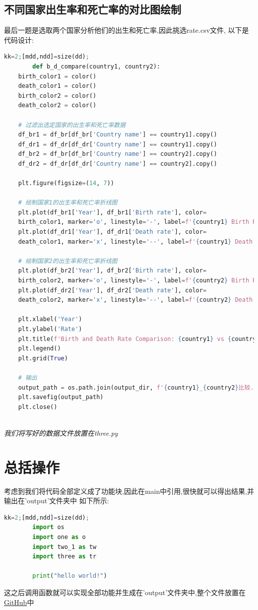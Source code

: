 \documentclass{ctexart}
\begin{document}
    \subsection{\textbf{不同国家出生率和死亡率的对比图绘制}}
    \noindent 最后一题是选取两个国家分析他们的出生和死亡率,因此挑选rate.csv文件,
    以下是代码设计:
    \begin{lstlisting}[language=Python]
        kk=2;[mdd,ndd]=size(dd);
        def b_d_compare(country1, country2):
    birth_color1 = color()
    death_color1 = color()
    birth_color2 = color()
    death_color2 = color()

    # 过滤出选定国家的出生率和死亡率数据
    df_br1 = df_br[df_br['Country name'] == country1].copy()
    df_dr1 = df_dr[df_dr['Country name'] == country1].copy()
    df_br2 = df_br[df_br['Country name'] == country2].copy()
    df_dr2 = df_dr[df_dr['Country name'] == country2].copy()

    plt.figure(figsize=(14, 7))

    # 绘制国家1的出生率和死亡率折线图
    plt.plot(df_br1['Year'], df_br1['Birth rate'], color=
    birth_color1, marker='o', linestyle='-', label=f'{country1} Birth Rate')
    plt.plot(df_dr1['Year'], df_dr1['Death rate'], color=
    death_color1, marker='x', linestyle='--', label=f'{country1} Death Rate')

    # 绘制国家2的出生率和死亡率折线图
    plt.plot(df_br2['Year'], df_br2['Birth rate'], color=
    birth_color2, marker='o', linestyle='-', label=f'{country2} Birth Rate')
    plt.plot(df_dr2['Year'], df_dr2['Death rate'], color=
    death_color2, marker='x', linestyle='--', label=f'{country2} Death Rate')

    plt.xlabel('Year')
    plt.ylabel('Rate')
    plt.title(f'Birth and Death Rate Comparison: {country1} vs {country2}')
    plt.legend()
    plt.grid(True)

    # 输出
    output_path = os.path.join(output_dir, f'{country1}_{country2}比较.png')
    plt.savefig(output_path)
    plt.close()
        
    \end{lstlisting}
    \par \vspace{1cm} \noindent \emph{我们将写好的数据文件放置在three.py}

    \section{\textbf{总括操作}}
    \noindent 考虑到我们将代码全部定义成了功能块,因此在main中引用,很快就可以得出结果,并输出在'output'文件夹中
    如下所示:
        \begin{lstlisting}[language=Python] %设置不同语言即可。
        kk=2;[mdd,ndd]=size(dd);
        import os
        import one as o
        import two_1 as tw
        import three as tr

        print("hello world!")

        \end{lstlisting}
    这之后调用函数就可以实现全部功能并生成在'output'文件夹中,整个文件放置在\href{https://github.com/LucyJesus/Py_DataAny_project.git}{GitHub}中
\end{document}
